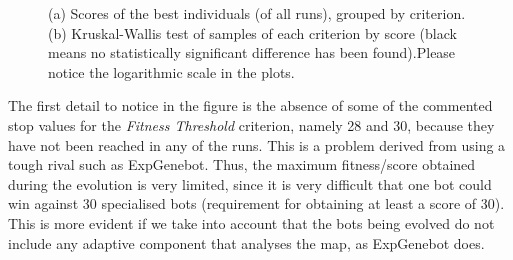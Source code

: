\documentclass[runningheads,a4paper]{llncs}
\begin{document}
\begin{figure}
\begin{center}
\end{center} 
\caption{(a) Scores of the best individuals (of all runs), grouped by criterion. (b) Kruskal-Wallis test of samples of each criterion by score (black means no statistically significant difference has been found).Please notice the logarithmic scale in the plots.}
\label{fig:boxplotscore}
\end{figure}



The first detail to notice in the figure is the absence of some of the commented stop values for the \textit{Fitness Threshold} criterion, namely 28 and 30, because they have not been reached in any of the runs.
This is a problem derived from using a tough rival such as ExpGenebot. Thus, the maximum fitness/score obtained during the evolution is very limited, since it is very difficult that one bot could win against 30 specialised bots \cite{Wolpert97nofree} (requirement for obtaining at least a score of 30). This is more evident if we take into account that the bots being evolved do not include any adaptive component that analyses the map, as ExpGenebot does. 
\end{document}
